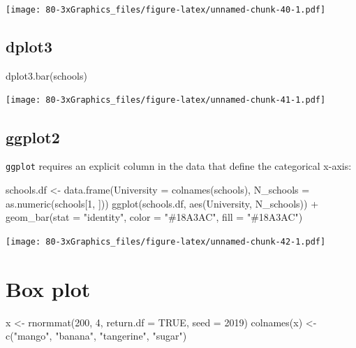 \documentclass[
]{book}
\newenvironment{Shaded}{\begin{snugshade}}{\end{snugshade}}
\newcommand{\AttributeTok}[1]{\textcolor[rgb]{0.77,0.63,0.00}{#1}}
\newcommand{\ConstantTok}[1]{\textcolor[rgb]{0.00,0.00,0.00}{#1}}
\newcommand{\DecValTok}[1]{\textcolor[rgb]{0.00,0.00,0.81}{#1}}
\newcommand{\FunctionTok}[1]{\textcolor[rgb]{0.00,0.00,0.00}{#1}}
\newcommand{\NormalTok}[1]{#1}
\newcommand{\OtherTok}[1]{\textcolor[rgb]{0.56,0.35,0.01}{#1}}
\newcommand{\SpecialCharTok}[1]{\textcolor[rgb]{0.00,0.00,0.00}{#1}}
\newcommand{\StringTok}[1]{\textcolor[rgb]{0.31,0.60,0.02}{#1}}
\begin{document}
\texttt{[image: 80-3xGraphics\_files/figure-latex/unnamed-chunk-40-1.pdf]}

\hypertarget{dplot3-4}{%
\subsection{\texorpdfstring{\textbf{dplot3}}{dplot3}}\label{dplot3-4}}

\begin{Shaded}
\begin{Highlighting}[]
\FunctionTok{dplot3.bar}\NormalTok{(schools)}
\end{Highlighting}
\end{Shaded}

\texttt{[image: 80-3xGraphics\_files/figure-latex/unnamed-chunk-41-1.pdf]}

\hypertarget{ggplot2-5}{%
\subsection{\texorpdfstring{\textbf{ggplot2}}{ggplot2}}\label{ggplot2-5}}

\texttt{ggplot} requires an explicit column in the data that define the categorical x-axis:

\begin{Shaded}
\begin{Highlighting}[]
\NormalTok{schools.df }\OtherTok{\textless{}{-}} \FunctionTok{data.frame}\NormalTok{(}\AttributeTok{University =} \FunctionTok{colnames}\NormalTok{(schools),}
                         \AttributeTok{N\_schools =} \FunctionTok{as.numeric}\NormalTok{(schools[}\DecValTok{1}\NormalTok{, ]))}
\FunctionTok{ggplot}\NormalTok{(schools.df, }\FunctionTok{aes}\NormalTok{(University, N\_schools)) }\SpecialCharTok{+}
  \FunctionTok{geom\_bar}\NormalTok{(}\AttributeTok{stat =} \StringTok{"identity"}\NormalTok{, }\AttributeTok{color =} \StringTok{"\#18A3AC"}\NormalTok{, }\AttributeTok{fill =} \StringTok{"\#18A3AC"}\NormalTok{)}
\end{Highlighting}
\end{Shaded}

\texttt{[image: 80-3xGraphics\_files/figure-latex/unnamed-chunk-42-1.pdf]}

\hypertarget{box-plot}{%
\section{Box plot}\label{box-plot}}

\begin{Shaded}
\begin{Highlighting}[]
\NormalTok{x }\OtherTok{\textless{}{-}} \FunctionTok{rnormmat}\NormalTok{(}\DecValTok{200}\NormalTok{, }\DecValTok{4}\NormalTok{, }\AttributeTok{return.df =} \ConstantTok{TRUE}\NormalTok{, }\AttributeTok{seed =} \DecValTok{2019}\NormalTok{)}
\FunctionTok{colnames}\NormalTok{(x) }\OtherTok{\textless{}{-}} \FunctionTok{c}\NormalTok{(}\StringTok{"mango"}\NormalTok{, }\StringTok{"banana"}\NormalTok{, }\StringTok{"tangerine"}\NormalTok{, }\StringTok{"sugar"}\NormalTok{)}
\end{Highlighting}
\end{Shaded}
\end{document}
